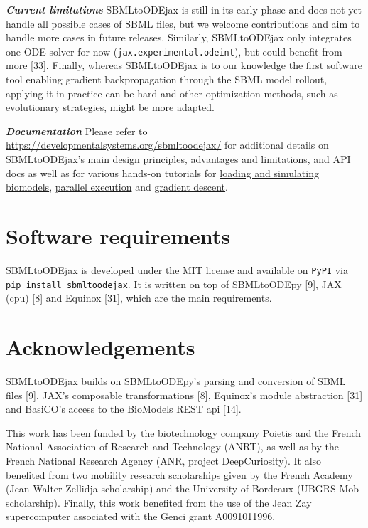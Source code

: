 \documentclass[
]{article}
\begin{document}
\textbf{\emph{Current limitations}} SBMLtoODEjax is still in its early
phase and does not yet handle all possible cases of SBML files, but we
welcome contributions and aim to handle more cases in future releases.
Similarly, SBMLtoODEjax only integrates one ODE solver for now
(\texttt{jax.experimental.odeint}), but could benefit from more
{[}33{]}. Finally, whereas SBMLtoODEjax is to our knowledge the first
software tool enabling gradient backpropagation through the SBML model
rollout, applying it in practice can be hard and other optimization
methods, such as evolutionary strategies, might be more adapted.

\textbf{\emph{Documentation}} Please refer to
\url{https://developmentalsystems.org/sbmltoodejax/} for additional
details on SBMLtoODEjax's main
\href{https://developmentalsystems.org/sbmltoodejax/design_principles.html}{design
principles},
\href{https://developmentalsystems.org/sbmltoodejax/why_use.html}{advantages
and limitations}, and API docs as well as for various hands-on tutorials
for
\href{https://developmentalsystems.org/sbmltoodejax/tutorials/biomodels_curation.html}{loading
and simulating biomodels},
\href{https://developmentalsystems.org/sbmltoodejax/tutorials/parallel_execution.html}{parallel
execution} and
\href{https://developmentalsystems.org/sbmltoodejax/tutorials/gradient_descent.html}{gradient
descent}.

\hypertarget{software-requirements}{%
\section{Software requirements}\label{software-requirements}}

SBMLtoODEjax is developed under the MIT license and available on
\texttt{PyPI} via \texttt{pip\ install\ sbmltoodejax}. It is written on
top of SBMLtoODEpy {[}9{]}, JAX (cpu) {[}8{]} and Equinox {[}31{]},
which are the main requirements.

\hypertarget{acknowledgements}{%
\section{Acknowledgements}\label{acknowledgements}}

SBMLtoODEjax builds on SBMLtoODEpy's parsing and conversion of SBML
files {[}9{]}, JAX's composable transformations {[}8{]}, Equinox's
module abstraction {[}31{]} and BasiCO's access to the BioModels REST
api {[}14{]}.

This work has been funded by the biotechnology company Poietis and the
French National Association of Research and Technology (ANRT), as well
as by the French National Research Agency (ANR, project DeepCuriosity).
It also benefited from two mobility research scholarships given by the
French Academy (Jean Walter Zellidja scholarship) and the University of
Bordeaux (UBGRS-Mob scholarship). Finally, this work benefited from the
use of the Jean Zay supercomputer associated with the Genci grant
A0091011996.
\end{document}
